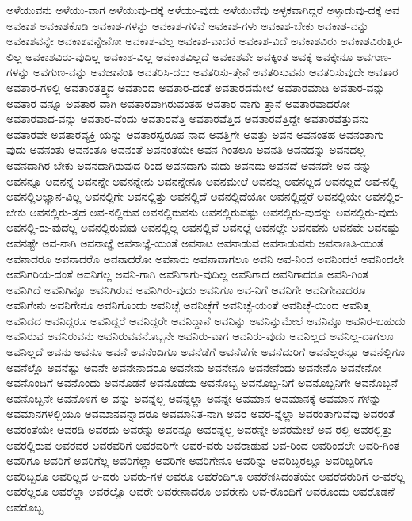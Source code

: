 {ಅಳೆಯುವನು
ಅಳೆಯು-ವಾಗ
ಅಳೆಯುವು-ದಕ್ಕೆ
ಅಳೆಯು-ವುದು
ಅಳೆಯುವೆವು
ಅಳ್ಳಕವಾಗಿದ್ದರೆ
ಅಳ್ಳಾಡುವು-ದಕ್ಕೆ
ಅವ
ಅವಕಾಶ
ಅವಕಾಶಕೊಡಿ
ಅವಕಾಶ-ಗಳನ್ನು
ಅವಕಾಶ-ಗಳಿವೆ
ಅವಕಾಶ-ಗಳು
ಅವಕಾಶ-ಬೇಕು
ಅವಕಾಶ-ವನ್ನು
ಅವಕಾಶವನ್ನೇ
ಅವಕಾಶವನ್ನೇನೋ
ಅವಕಾಶ-ವಲ್ಲ
ಅವಕಾಶ-ವಾದರೆ
ಅವಕಾಶ-ವಿದೆ
ಅವಕಾಶವಿರು
ಅವಕಾಶವಿರುತ್ತಿರ-ಲಿಲ್ಲ
ಅವಕಾಶವಿರು-ವುದಿಲ್ಲ
ಅವಕಾಶ-ವಿಲ್ಲ
ಅವಕಾಶವಿಲ್ಲದೆ
ಅವಕಾಶವೇ
ಅವಕ್ಕಿಂತ
ಅವಕ್ಕೆ
ಅವಕ್ಕೇನೂ
ಅವಗುಣ-ಗಳನ್ನು
ಅವಗುಣ-ವನ್ನು
ಅವಜಾನಂತಿ
ಅವತರಿಸಿ-ದರು
ಅವತರಿಸು-ತ್ತೇನೆ
ಅವತರಿಸುವನು
ಅವತರಿಸುವುದೇ
ಅವತಾರ
ಅವತಾರ-ಗಳಲ್ಲಿ
ಅವತಾರತತ್ತ್ವದ
ಅವತಾರದ
ಅವತಾರ-ದಂತೆ
ಅವತಾರದಮೇಲೆ
ಅವತಾರಮಾಡಿ
ಅವತಾರ-ವನ್ನು
ಅವತಾರ-ವನ್ನೂ
ಅವತಾರ-ವಾಗಿ
ಅವತಾರವಾಗಿರುವಂತಹ
ಅವತಾರ-ವಾಗು-ತ್ತಾನೆ
ಅವತಾರವಾದರೋ
ಅವತಾರವಾದ-ವನ್ನು
ಅವತಾರ-ವೆಂದು
ಅವತಾರವೆತ್ತಿ
ಅವತಾರವೆತ್ತಿದ
ಅವತಾರವೆತ್ತಿದ್ದೇ
ಅವತಾರವೆತ್ತುವನು
ಅವತಾರವೇ
ಅವತಾರವ್ಯಕ್ತಿ-ಯನ್ನು
ಅವತಾರಸ್ವರೂಪ-ನಾದ
ಅವತ್ತಿಗೇ
ಅವತ್ತು
ಅವನ
ಅವನಂತಹ
ಅವನಂತಾಗು-ವುದು
ಅವನಂತು
ಅವನಂತೂ
ಅವನಂತೆ
ಅವನಂತೆಯೇ
ಅವನ-ಗಿಂತಲೂ
ಅವನತಿ
ಅವನದನ್ನು
ಅವನದಲ್ಲ
ಅವನದಾಗಿರ-ಬೇಕು
ಅವನದಾಗಿರುವುದ-ರಿಂದ
ಅವನದಾಗು-ವುದು
ಅವನದು
ಅವನದೆ
ಅವನದೇ
ಅವ-ನನ್ನು
ಅವನನ್ನೂ
ಅವನನ್ನೆ
ಅವನನ್ನೇ
ಅವನನ್ನೇನು
ಅವನನ್ನೇನೂ
ಅವನಮೇಲೆ
ಅವನಲ್ಲ
ಅವನಲ್ಲದ
ಅವನಲ್ಲದೆ
ಅವ-ನಲ್ಲಿ
ಅವನಲ್ಲಿಅಜ್ಞಾನ-ವಿಲ್ಲ
ಅವನಲ್ಲಿಗೇ
ಅವನಲ್ಲಿತ್ತು
ಅವನಲ್ಲಿದೆ
ಅವನಲ್ಲಿದೆಯೋ
ಅವನಲ್ಲಿದ್ದರೆ
ಅವನಲ್ಲಿಯೇ
ಅವನಲ್ಲಿರ-ಬೇಕು
ಅವನಲ್ಲಿರು-ತ್ತದೆ
ಅವ-ನಲ್ಲಿರುವ
ಅವನಲ್ಲಿರುವನು
ಅವನಲ್ಲಿರುವಷ್ಟು
ಅವನಲ್ಲಿರು-ವುದನ್ನು
ಅವನಲ್ಲಿರು-ವುದು
ಅವನಲ್ಲಿ-ರು-ವುದೆಲ್ಲ
ಅವನಲ್ಲಿರುವುವು
ಅವನಲ್ಲಿಲ್ಲ
ಅವನಲ್ಲಿವೆ
ಅವನಲ್ಲೆ
ಅವನಲ್ಲೇ
ಅವನವನು
ಅವನವೇ
ಅವನಷ್ಟು
ಅವನಷ್ಟೇ
ಅವ-ನಾಗಿ
ಅವನಾಜ್ಞೆ
ಅವನಾಜ್ಞೆ-ಯಂತೆ
ಅವನಾಟ
ಅವನಾಡುವ
ಅವನಾಡುವನು
ಅವನಾಣತಿ-ಯಂತೆ
ಅವನಾದರೂ
ಅವನಾದರೊ
ಅವನಾದರೋ
ಅವನಾರು
ಅವನಾವಾಗಲೂ
ಅವನಿ
ಅವ-ನಿಂದ
ಅವನಿಂದಲೆ
ಅವನಿಂದಲೇ
ಅವನಿಗರಿಯ-ದಂತೆ
ಅವನಿಗಲ್ಲ
ಅವನಿ-ಗಾಗಿ
ಅವನಿಗಾಗು-ವುದಿಲ್ಲ
ಅವನಿಗಾದ
ಅವನಿಗಾದರೂ
ಅವನಿ-ಗಿಂತ
ಅವನಿಗಿದೆ
ಅವನಿಗಿನ್ನೂ
ಅವನಿಗಿರುವ
ಅವನಿಗಿರು-ವುದು
ಅವನಿಗೂ
ಅವ-ನಿಗೆ
ಅವನಿಗೇ
ಅವನಿಗೇನಾದರೂ
ಅವನಿಗೇನು
ಅವನಿಗೇನೂ
ಅವನಿಗೊಂದು
ಅವನಿಚ್ಛೆ
ಅವನಿಚ್ಛೆಗೆ
ಅವನಿಚ್ಛೆ-ಯಂತೆ
ಅವನಿಚ್ಛೆ-ಯಿಂದ
ಅವನಿತ್ತ
ಅವನಿದದ
ಅವನಿದ್ದರೂ
ಅವನಿದ್ದರೆ
ಅವನಿದ್ದರೇ
ಅವನಿದ್ದಾನೆ
ಅವನಿನ್ನು
ಅವನಿನ್ನುಮೇಲೆ
ಅವನಿನ್ನೂ
ಅವನಿರ-ಬಹುದು
ಅವನಿರುವ
ಅವನಿರುವನು
ಅವನಿರುವವನೊಬ್ಬನೇ
ಅವನಿರು-ವಾಗ
ಅವನಿರು-ವುದು
ಅವನಿಲ್ಲದ
ಅವನಿಲ್ಲ-ದಾಗಲೂ
ಅವನಿಲ್ಲದೆ
ಅವನು
ಅವನೂ
ಅವನೆ
ಅವನೆಂದಿಗೂ
ಅವನೆಡೆಗೆ
ಅವನೆಡೆಗೇ
ಅವನೆದುರಿಗೆ
ಅವನೆಲ್ಲರನ್ನೂ
ಅವನೆಲ್ಲಿಗೂ
ಅವನೆಲ್ಲೊ
ಅವನೆಷ್ಟು
ಅವನೇ
ಅವನೇನಾದರೂ
ಅವನೇನು
ಅವನೇನೂ
ಅವನೇನೆಂದು
ಅವನೇನೊ
ಅವನೇನೋ
ಅವನೊಂದಿಗೆ
ಅವನೊಂದು
ಅವನೊಡನೆ
ಅವನೊಡೆಯ
ಅವನೊಬ್ಬ
ಅವನೊಬ್ಬ-ನಿಗೆ
ಅವನೊಬ್ಬನಿಗೇ
ಅವನೊಬ್ಬನೆ
ಅವನೊಬ್ಬನೇ
ಅವನೊಳಗೆ
ಅ-ವನ್ನು
ಅವನ್ನೆಲ್ಲ
ಅವನ್ನೆಲ್ಲಾ
ಅವನ್ನೇ
ಅವಮಾನ
ಅವಮಾನಕ್ಕೆ
ಅವಮಾನ-ಗಳನ್ನು
ಅವಮಾನಗಳಲ್ಲಿಯೂ
ಅವಮಾನವನ್ನಾದರೂ
ಅವಮಾನಿತ-ನಾಗಿ
ಅವರ
ಅವರ-ನ್ನೆಲ್ಲಾ
ಅವರಂತಾಗುವೆವು
ಅವರಂತೆ
ಅವರಂತೆಯೇ
ಅವರಡಿ
ಅವರದು
ಅವರನ್ನು
ಅವರನ್ನೂ
ಅವರನ್ನೆಲ್ಲ
ಅವರನ್ನೇ
ಅವರಮೇಲೆ
ಅವ-ರಲ್ಲಿ
ಅವರಲ್ಲಿತ್ತು
ಅವರಲ್ಲಿರುವ
ಅವರವರ
ಅವರವರಿಗೆ
ಅವರವರಿಗೇ
ಅವರ-ವರು
ಅವರಾಡುವ
ಅವ-ರಿಂದ
ಅವರಿಂದಲೇ
ಅವರಿ-ಗಿಂತ
ಅವರಿಗೂ
ಅವರಿಗೆ
ಅವರಿಗೆಲ್ಲ
ಅವರಿಗೆಲ್ಲಾ
ಅವರಿಗೇ
ಅವರಿಗೇನೂ
ಅವರಿನ್ನು
ಅವರಿಬ್ಬರಲ್ಲೂ
ಅವರಿಬ್ಬರಿಗೂ
ಅವರಿಬ್ಬರೂ
ಅವರಿಲ್ಲದ
ಅ-ವರು
ಅವರು-ಗಳ
ಅವರೂ
ಅವರೆಂದಿಗೂ
ಅವರೆಣಿಸಿದಂತೆಯೇ
ಅವರೆದರುರಿಗೆ
ಅ-ವರೆಲ್ಲ
ಅವರೆಲ್ಲರೂ
ಅವರೆಲ್ಲಾ
ಅವರೆಲ್ಲೊ
ಅವರೇ
ಅವರೇನಾದರೂ
ಅವರೇನು
ಅವ-ರೊಂದಿಗೆ
ಅವರೊಂದು
ಅವರೊಡನೆ
ಅವರೊಬ್ಬ
}
